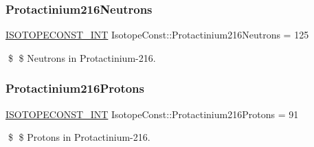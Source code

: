 \subsubsection{\texorpdfstring{Protactinium216\+Neutrons}{Protactinium216Neutrons}}
{\footnotesize\ttfamily \mbox{\hyperlink{group___isotope_const-_macros_ga5f18360b3e99483a35c32d789e62621c}{I\+S\+O\+T\+O\+P\+E\+C\+O\+N\+S\+T\+\_\+\+I\+NT}} Isotope\+Const\+::\+Protactinium216\+Neutrons = 125}

\$ \$ Neutrons in Protactinium-\/216. \mbox{\label{group___isotope_const-_protactinium-_pa216_gab6eece5d0299d7e975290b4f1b242807}} 
\subsubsection{\texorpdfstring{Protactinium216\+Protons}{Protactinium216Protons}}
{\footnotesize\ttfamily \mbox{\hyperlink{group___isotope_const-_macros_ga5f18360b3e99483a35c32d789e62621c}{I\+S\+O\+T\+O\+P\+E\+C\+O\+N\+S\+T\+\_\+\+I\+NT}} Isotope\+Const\+::\+Protactinium216\+Protons = 91}

\$ \$ Protons in Protactinium-\/216. 